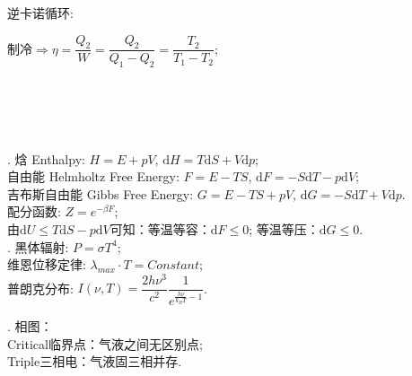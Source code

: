 \documentclass[12pt, 
]{article}
\begin{document}
\hspace{-2cm}
\noindent 逆卡诺循环:

\noindent 制冷$\Rightarrow \eta=\dfrac{Q_2}{W}=\dfrac{Q_2}{Q_1-Q_2}=\dfrac{T_2}{T_1-T_2}$;

~\\~\\~\\~\\

\vspace{-0.5cm}
. 焓 Enthalpy: $H=E+pV$, $\mathrm{d}H=T\mathrm{d}S+V\mathrm{d}p$;
~\\\phantom{~~~}自由能 Helmholtz Free Energy: $F=E-TS$, $\mathrm{d}F=-S\mathrm{d}T-p\mathrm{d}V$;
~\\\phantom{~~~}吉布斯自由能 Gibbs Free Energy: $G=E-TS+pV$, $\mathrm{d}G=-S\mathrm{d}T+V\mathrm{d}p$.
~\\\phantom{~~~}配分函数: $Z=e^{-\beta F}$;
~\\\phantom{~~~}由$\mathrm{d}U\leqslant T\mathrm{d}S-p\mathrm{d}V$可知：等温等容：$\mathrm{d}F\leqslant 0$; 等温等压：$\mathrm{d}G\leqslant 0$.
~\\

. 黑体辐射: $P=\sigma T^4$;
~\\\phantom{~~~}维恩位移定律: $\lambda_{max}\cdot T=Constant$;
~\\\phantom{~~~}普朗克分布: $I(\nu, T)=\dfrac{2h\nu^3}{c^2}\dfrac{1}{e^{\frac{h\nu}{k_BT}-1}}$.
~\\
\begin{figure}
\vspace{-1.5cm}
\hspace{-0.5cm}
\label{fg:10}
\end{figure}

\vspace{-0.5cm}
. 相图：
~\\\phantom{~~~~} Critical临界点：气液之间无区别点;
~\\\phantom{~~~~} Triple三相电：气液固三相并存.
~\\
\end{document}
